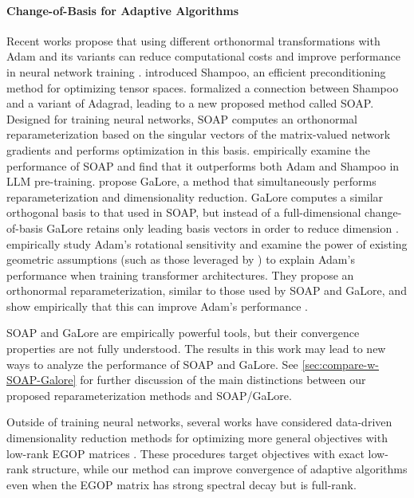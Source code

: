 \documentclass{article}
\begin{document}
\paragraph{Change-of-Basis for Adaptive Algorithms} Recent works propose that using different orthonormal transformations with Adam and its variants can reduce computational costs and improve performance in neural network training \cite{maes2024understanding,vyas2024soap,  zhao2024galore}. \citet{gupta2018shampoo} introduced Shampoo, an efficient preconditioning method for optimizing tensor spaces. \citet{vyas2024soap} formalized a connection between Shampoo and a variant of Adagrad, leading to a new proposed method called SOAP. Designed for training neural networks, SOAP computes an orthonormal reparameterization based on the singular vectors of the matrix-valued network gradients and performs optimization in this basis. \citet{vyas2024soap} empirically examine the performance of SOAP and find that it outperforms both Adam and Shampoo in LLM pre-training. \citet{zhao2024galore} propose GaLore, a method that simultaneously performs reparameterization and dimensionality reduction. GaLore computes a similar orthogonal basis to that used in SOAP, but instead of a full-dimensional change-of-basis GaLore retains only leading basis vectors in order to reduce dimension \cite{zhao2024galore}. \citet{maes2024understanding} empirically study Adam's rotational sensitivity and examine the power of existing geometric assumptions (such as those leveraged by \citet{xie2024adamexploitsellinftygeometryloss}) to explain Adam's performance when training transformer architectures. They propose an orthonormal reparameterization, similar to those used by SOAP and GaLore, and show empirically that this can improve Adam's performance \cite{maes2024understanding}. 

SOAP and GaLore are empirically powerful tools, but their convergence properties are not fully understood. The results in this work may lead to new ways to analyze the performance of SOAP and GaLore. See \cref{sec:compare-w-SOAP-Galore} for further discussion of the main distinctions between our proposed reparameterization methods and SOAP/GaLore.

Outside of training neural networks, several works have considered data-driven dimensionality reduction methods for optimizing more general objectives with low-rank EGOP matrices \cite{cartis2024learning, cosson2023low}. These procedures target objectives with exact low-rank structure, while our method can improve convergence of adaptive algorithms even when the EGOP matrix has strong spectral decay but is full-rank.
\end{document}
